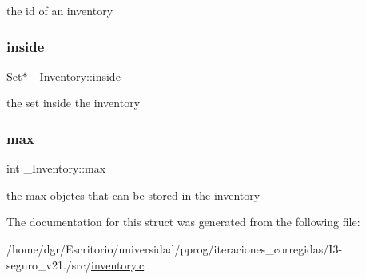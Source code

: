 the id of an inventory \mbox{\label{struct__Inventory_ab6ad3d65f6119379be87edf22db640cb}} 
\subsubsection{\texorpdfstring{inside}{inside}}
{\footnotesize\ttfamily \hyperlink{set_8h_a6d3b7f7c92cbb4577ef3ef7ddbf93161}{Set}$\ast$ \+\_\+\+Inventory\+::inside}

the set inside the inventory \mbox{\label{struct__Inventory_ac09bcf212b2c7ff348066b2e5f28bb9c}} 
\subsubsection{\texorpdfstring{max}{max}}
{\footnotesize\ttfamily int \+\_\+\+Inventory\+::max}

the max objetcs that can be stored in the inventory 

The documentation for this struct was generated from the following file\+:\begin{DoxyCompactItemize}
\item 
/home/dgr/\+Escritorio/universidad/pprog/iteraciones\+\_\+corregidas/\+I3-\/seguro\+\_\+v21./src/\hyperlink{inventory_8c}{inventory.\+c}\end{DoxyCompactItemize}

